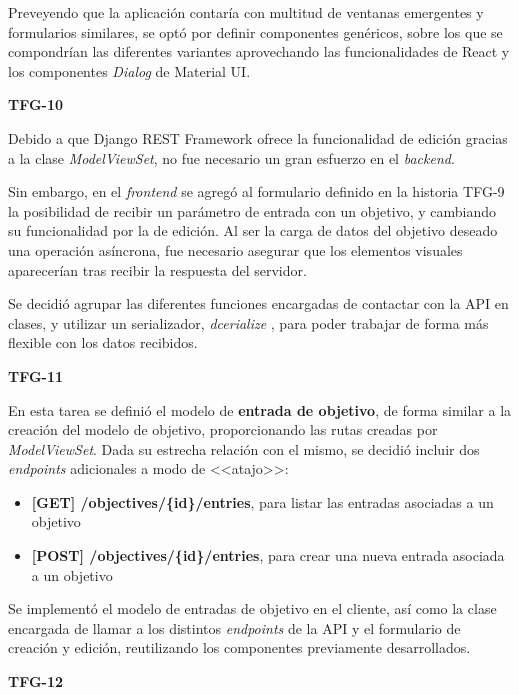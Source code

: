 \documentclass[10pt, a4paper]{aqademic}
\begin{document}
Preveyendo que la aplicación contaría con multitud de ventanas emergentes y formularios similares, se optó por definir componentes genéricos, sobre los que se compondrían las diferentes variantes aprovechando las funcionalidades de React y los componentes \textit{Dialog} de Material UI.

\medskip

\textbf{TFG-10}

Debido a que Django REST Framework ofrece la funcionalidad de edición gracias a la clase \textit{ModelViewSet}, no fue necesario un gran esfuerzo en el \textit{backend}.

Sin embargo, en el \textit{frontend} se agregó al formulario definido en la historia TFG-9 la posibilidad de recibir un parámetro de entrada con un objetivo, y cambiando su funcionalidad por la de edición. Al ser la carga de datos del objetivo deseado una operación asíncrona, fue necesario asegurar que los elementos visuales aparecerían tras recibir la respuesta del servidor.

Se decidió agrupar las diferentes funciones encargadas de contactar con la API en clases, y utilizar un serializador, \textit{dcerialize} \cite{noauthor_dcerialize_nodate}, para poder trabajar de forma más flexible con los datos recibidos. 

\medskip

\textbf{TFG-11}

En esta tarea se definió el modelo de \textbf{entrada de objetivo}, de forma similar a la creación del modelo de objetivo, proporcionando las rutas creadas por \textit{ModelViewSet}. Dada su estrecha relación con el mismo, se decidió incluir dos \textit{endpoints} adicionales a modo de <<atajo>>: 

\begin{itemize}
	\item \textbf{[GET] /objectives/\{id\}/entries}, para listar las entradas asociadas a un objetivo
	\item \textbf{[POST] /objectives/\{id\}/entries}, para crear una nueva entrada asociada a un objetivo
\end{itemize}

Se implementó el modelo de entradas de objetivo en el cliente, así como la clase encargada de llamar a los distintos \textit{endpoints} de la API y el formulario de creación y edición, reutilizando los componentes previamente desarrollados.

\medskip

\textbf{TFG-12}
\end{document}
